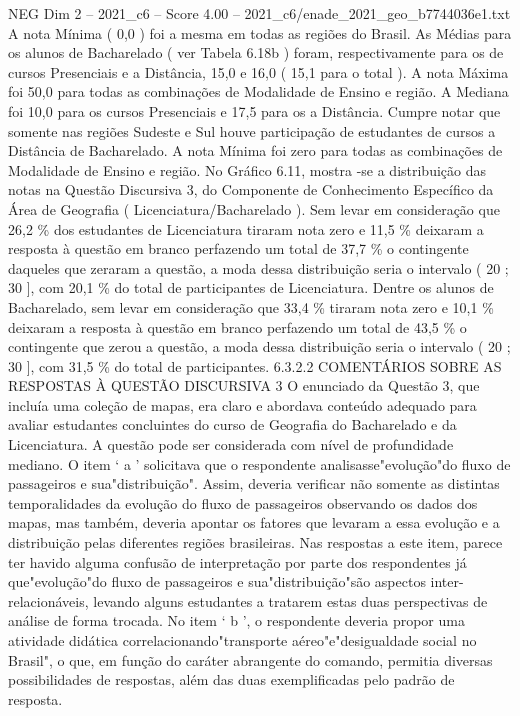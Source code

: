 \begin{textsample}{NEG Dim 2 – 2021\_c6 – Score 4.00 – 2021\_c6/enade\_2021\_geo\_b7744036e1.txt}
A nota Mínima ( 0,0 ) foi a mesma em todas as regiões do Brasil.
As Médias para os alunos de Bacharelado ( ver Tabela 6.18b ) foram, respectivamente para os de cursos Presenciais e a Distância, 15,0 e 16,0 ( 15,1 para o total ).
A nota Máxima foi 50,0 para todas as combinações de Modalidade de Ensino e região.
A Mediana foi 10,0 para os cursos Presenciais e 17,5 para os a Distância.
Cumpre notar que somente nas regiões Sudeste e Sul houve participação de estudantes de cursos a Distância de Bacharelado.
A nota Mínima foi zero para todas as combinações de Modalidade de Ensino e região.
No Gráfico 6.11, mostra -se a distribuição das notas na Questão Discursiva 3, do Componente de Conhecimento Específico da Área de Geografia ( Licenciatura/Bacharelado ).
Sem levar em consideração que 26,2 \% dos estudantes de Licenciatura tiraram nota zero e 11,5 \% deixaram a resposta à questão em branco perfazendo um total de 37,7 \% o contingente daqueles que zeraram a questão, a moda dessa distribuição seria o intervalo ( 20 ; 30 ], com 20,1 \% do total de participantes de Licenciatura.
Dentre os alunos de Bacharelado, sem levar em consideração que 33,4 \% tiraram nota zero e 10,1 \% deixaram a resposta à questão em branco perfazendo um total de 43,5 \% o contingente que zerou a questão, a moda dessa distribuição seria o intervalo ( 20 ; 30 ], com 31,5 \% do total de participantes. 6.3.2.2 COMENTÁRIOS SOBRE AS RESPOSTAS À QUESTÃO DISCURSIVA 3 O enunciado da Questão 3, que incluía uma coleção de mapas, era claro e abordava conteúdo adequado para avaliar estudantes concluintes do curso de Geografia do Bacharelado e da Licenciatura.
A questão pode ser considerada com nível de profundidade mediano.
O item ‘ a ’ solicitava que o respondente analisasse"evolução"do fluxo de passageiros e sua"distribuição".
Assim, deveria verificar não somente as distintas temporalidades da evolução do fluxo de passageiros observando os dados dos mapas, mas também, deveria apontar os fatores que levaram a essa evolução e a distribuição pelas diferentes regiões brasileiras.
Nas respostas a este item, parece ter havido alguma confusão de interpretação por parte dos respondentes já que"evolução"do fluxo de passageiros e sua"distribuição"são aspectos inter-relacionáveis, levando alguns estudantes a tratarem estas duas perspectivas de análise de forma trocada.
No item ‘ b ’, o respondente deveria propor uma atividade didática correlacionando"transporte aéreo"e"desigualdade social no Brasil", o que, em função do caráter abrangente do comando, permitia diversas possibilidades de respostas, além das duas exemplificadas pelo padrão de resposta.

\end{textsample}
